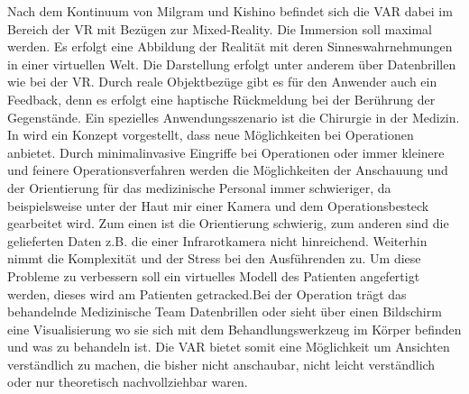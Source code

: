 \documentclass[12pt,a4paper,bibliography=totocnumbered,listof=totocnumbered]{scrartcl}
\begin{document}
Nach dem Kontinuum von Milgram und Kishino befindet sich die VAR dabei im Bereich der VR mit Bezügen zur Mixed-Reality. Die Immersion soll maximal werden. Es erfolgt eine Abbildung der Realität mit deren Sinneswahrnehmungen in einer virtuellen Welt. Die Darstellung erfolgt unter anderem über Datenbrillen wie bei der VR. Durch reale Objektbezüge gibt es für den Anwender auch ein Feedback, denn es erfolgt eine haptische Rückmeldung bei der Berührung der Gegenstände. \newline
Ein spezielles Anwendungsszenario ist die Chirurgie in der Medizin. In \cite{OLMOS:2014aa} wird ein Konzept vorgestellt, dass neue Möglichkeiten bei Operationen anbietet. Durch minimalinvasive Eingriffe bei Operationen oder immer kleinere und feinere Operationsverfahren werden die Möglichkeiten der Anschauung und der Orientierung für das medizinische Personal immer schwieriger, da beispielsweise unter der Haut mir einer Kamera und dem Operationsbesteck gearbeitet wird. Zum einen ist die Orientierung schwierig, zum anderen sind die gelieferten Daten z.B. die einer Infrarotkamera nicht hinreichend. Weiterhin nimmt die Komplexität und der Stress bei den Ausführenden zu. Um diese Probleme zu verbessern soll ein virtuelles Modell des Patienten angefertigt werden, dieses wird am Patienten getracked.Bei der Operation trägt das behandelnde Medizinische Team Datenbrillen oder sieht über einen Bildschirm eine Visualisierung wo sie sich mit dem Behandlungswerkzeug im Körper befinden und was zu behandeln ist. \newline
Die VAR bietet somit eine Möglichkeit um Ansichten verständlich zu machen, die bisher nicht anschaubar, nicht leicht verständlich oder nur theoretisch nachvollziehbar waren.

\end{document}
